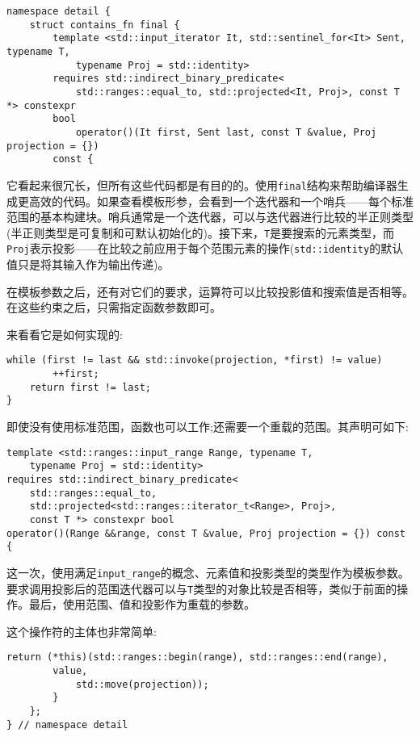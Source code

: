 \begin{lstlisting}[style=styleCXX]
namespace detail {
	struct contains_fn final {
		template <std::input_iterator It, std::sentinel_for<It> Sent, typename T,
			typename Proj = std::identity>
		requires std::indirect_binary_predicate<
			std::ranges::equal_to, std::projected<It, Proj>, const T *> constexpr
		bool
			operator()(It first, Sent last, const T &value, Proj projection = {})
		const {
\end{lstlisting}

它看起来很冗长，但所有这些代码都是有目的的。使用\texttt{final}结构来帮助编译器生成更高效的代码。如果查看模板形参，会看到一个迭代器和一个哨兵——每个标准范围的基本构建块。哨兵通常是一个迭代器，可以与迭代器进行比较的半正则类型(半正则类型是可复制和可默认初始化的)。接下来，\texttt{T}是要搜索的元素类型，而\texttt{Proj}表示投影——在比较之前应用于每个范围元素的操作(\texttt{std::identity}的默认值只是将其输入作为输出传递)。

在模板参数之后，还有对它们的要求，运算符可以比较投影值和搜索值是否相等。在这些约束之后，只需指定函数参数即可。

来看看它是如何实现的:

\begin{lstlisting}[style=styleCXX]
	while (first != last && std::invoke(projection, *first) != value)
		++first;
	return first != last;
}
\end{lstlisting}

即使没有使用标准范围，函数也可以工作;还需要一个重载的范围。其声明可如下:

\begin{lstlisting}[style=styleCXX]
template <std::ranges::input_range Range, typename T,
	typename Proj = std::identity>
requires std::indirect_binary_predicate<
	std::ranges::equal_to,
	std::projected<std::ranges::iterator_t<Range>, Proj>,
	const T *> constexpr bool
operator()(Range &&range, const T &value, Proj projection = {}) const {
\end{lstlisting}

这一次，使用满足\texttt{input\_range}的概念、元素值和投影类型的类型作为模板参数。要求调用投影后的范围迭代器可以与\texttt{T}类型的对象比较是否相等，类似于前面的操作。最后，使用范围、值和投影作为重载的参数。

这个操作符的主体也非常简单:

\begin{lstlisting}[style=styleCXX]
		return (*this)(std::ranges::begin(range), std::ranges::end(range),
		value,
			std::move(projection));
		}
	};
} // namespace detail
\end{lstlisting}

